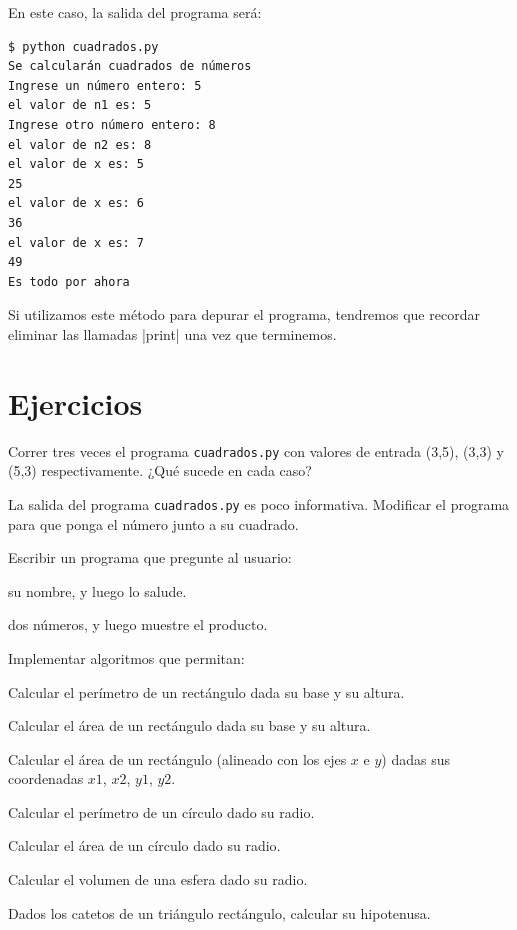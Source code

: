 En este caso, la salida del programa será:

\begin{lstlisting}[numbers=none]
$ python cuadrados.py
Se calcularán cuadrados de números
Ingrese un número entero: 5
el valor de n1 es: 5
Ingrese otro número entero: 8
el valor de n2 es: 8
el valor de x es: 5
25
el valor de x es: 6
36
el valor de x es: 7
49
Es todo por ahora
\end{lstlisting}

Si utilizamos este método para depurar el programa, tendremos que recordar
eliminar las llamadas |print| una vez que terminemos.

\newpage
\section{Ejercicios}

\begin{ejercicio}
Correr tres veces el programa \lstinline!cuadrados.py! con valores
de entrada (3,5), (3,3) y (5,3) respectivamente. ¿Qué sucede en
cada caso?
\end{ejercicio}

\begin{ejercicio}
La salida del programa \lstinline!cuadrados.py! es poco
informativa. Modificar el programa para que ponga el
número junto a su cuadrado.
\end{ejercicio}

\begin{ejercicio}
Escribir un programa que pregunte al usuario:
\begin{partes}
  \item su nombre, y luego lo salude.
  \item dos números, y luego muestre el producto.
\end{partes}
\end{ejercicio}

\begin{ejercicio} Implementar algoritmos que permitan:
\begin{partes}
 \item Calcular el perímetro de un rectángulo dada su base y su altura.
 \item Calcular el área de un rectángulo dada su base y su altura.
 \item Calcular el área de un rectángulo (alineado con los ejes $x$ e $y$)
     dadas sus coordenadas $x1$, $x2$, $y1$, $y2$.
 \item Calcular el perímetro de un círculo dado su radio.
 \item Calcular el área de un círculo dado su radio.
 \item Calcular el volumen de una esfera dado su radio.
 \item Dados los catetos de un triángulo rectángulo, calcular su hipotenusa.
\end{partes}
\end{ejercicio}

